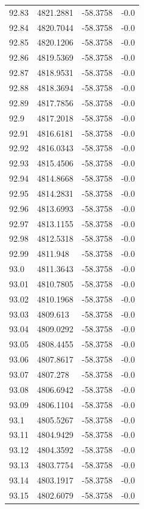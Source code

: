 \begin{table}[H]
\begin{tabular}{llll}
92.83 & 4821.2881 & -58.3758 & -0.0 \\
92.84 & 4820.7044 & -58.3758 & -0.0 \\
92.85 & 4820.1206 & -58.3758 & -0.0 \\
92.86 & 4819.5369 & -58.3758 & -0.0 \\
92.87 & 4818.9531 & -58.3758 & -0.0 \\
92.88 & 4818.3694 & -58.3758 & -0.0 \\
92.89 & 4817.7856 & -58.3758 & -0.0 \\
92.9 & 4817.2018 & -58.3758 & -0.0 \\
92.91 & 4816.6181 & -58.3758 & -0.0 \\
92.92 & 4816.0343 & -58.3758 & -0.0 \\
92.93 & 4815.4506 & -58.3758 & -0.0 \\
92.94 & 4814.8668 & -58.3758 & -0.0 \\
92.95 & 4814.2831 & -58.3758 & -0.0 \\
92.96 & 4813.6993 & -58.3758 & -0.0 \\
92.97 & 4813.1155 & -58.3758 & -0.0 \\
92.98 & 4812.5318 & -58.3758 & -0.0 \\
92.99 & 4811.948 & -58.3758 & -0.0 \\
93.0 & 4811.3643 & -58.3758 & -0.0 \\
93.01 & 4810.7805 & -58.3758 & -0.0 \\
93.02 & 4810.1968 & -58.3758 & -0.0 \\
93.03 & 4809.613 & -58.3758 & -0.0 \\
93.04 & 4809.0292 & -58.3758 & -0.0 \\
93.05 & 4808.4455 & -58.3758 & -0.0 \\
93.06 & 4807.8617 & -58.3758 & -0.0 \\
93.07 & 4807.278 & -58.3758 & -0.0 \\
93.08 & 4806.6942 & -58.3758 & -0.0 \\
93.09 & 4806.1104 & -58.3758 & -0.0 \\
93.1 & 4805.5267 & -58.3758 & -0.0 \\
93.11 & 4804.9429 & -58.3758 & -0.0 \\
93.12 & 4804.3592 & -58.3758 & -0.0 \\
93.13 & 4803.7754 & -58.3758 & -0.0 \\
93.14 & 4803.1917 & -58.3758 & -0.0 \\
93.15 & 4802.6079 & -58.3758 & -0.0 \\

\end{tabular}
\end{table}
